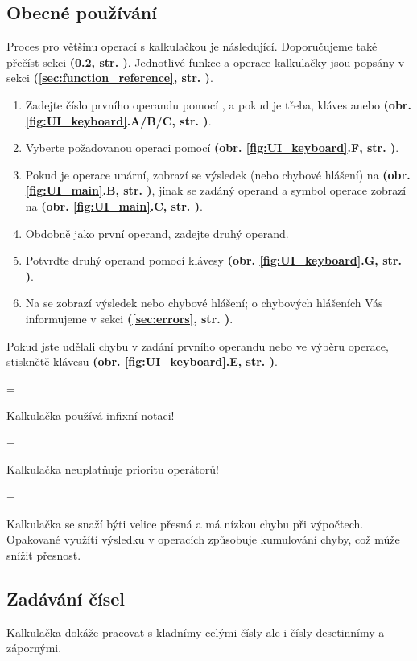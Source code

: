 \documentclass[a5paper,8pt,twoside]{extarticle}
\newenvironment{warningBox}
  {\par\begin{mdframed}[linewidth=1pt,linecolor=black]%
    \begin{list}{}{\leftmargin=1cm
                   \labelwidth=\leftmargin}\item[\Large\warning]}
  {\end{list}\end{mdframed}\par}
\newenvironment{infoBox}
  {\par\begin{mdframed}[linewidth=1pt,linecolor=black]%
    \begin{list}{}{\leftmargin=1cm
                   \labelwidth=\leftmargin}\item[\Large\lefthand]}
  {\end{list}\end{mdframed}\par}
\newcommand*\joinBox{\vspace{-0.9em}}
\newcommand*\nref[1]{\textbf{(\ref{#1}, str. \pageref{#1})}}
\newcommand*\fref[2]{\textbf{(obr. \ref{#1}#2, str. \pageref{#1})}}
\begin{document}
    \subsection{Obecné používání}
    \label{sec:general_use}
    Proces pro většinu operací s kalkulačkou je následující. Doporučujeme také přečíst sekci  \nref{sec:entering_numbers}. Jednotlivé funkce a operace kalkulačky jsou popsány v sekci  \nref{sec:function_reference}.
    \begin{enumerate}
        \item Zadejte číslo prvního operandu pomocí , a pokud je třeba, kláves  anebo  \fref{fig:UI_keyboard}{.A/B/C}.
        \item Vyberte požadovanou operaci pomocí  \fref{fig:UI_keyboard}{.F}.
        \item Pokud je operace unární, zobrazí se výsledek (nebo chybové hlášení) na  \fref{fig:UI_main}{.B}, jinak se zadáný operand a symbol operace zobrazí na  \fref{fig:UI_main}{.C}.
        \item Obdobně jako první operand, zadejte druhý operand.
        \item Potvrďte druhý operand pomocí klávesy  \fref{fig:UI_keyboard}{.G}.
        \item Na  se zobrazí výsledek nebo chybové hlášení; o chybových hlášeních Vás informujeme v sekci  \nref{sec:errors}.
    \end{enumerate}
    Pokud jste udělali chybu v zadání prvního operandu nebo ve výběru operace, stisknětě klávesu  \fref{fig:UI_keyboard}{.E}.
    \begin{infoBox}
        Kalkulačka používá infixní notaci!
    \end{infoBox}
    \joinBox
    \begin{infoBox}
        Kalkulačka neuplatňuje prioritu operátorů!
    \end{infoBox}
    \joinBox
    \begin{warningBox}
        Kalkulačka se snaží býti velice přesná a má nízkou chybu při výpočtech. Opakované využítí výsledku v operacích způsobuje kumulování chyby, což může snížit přesnost.
    \end{warningBox}
    \subsection{Zadávání čísel}
    \label{sec:entering_numbers}
    Kalkulačka dokáže pracovat s kladnímy celými čísly ale i čísly desetinnímy a zápornými.
\end{document}
